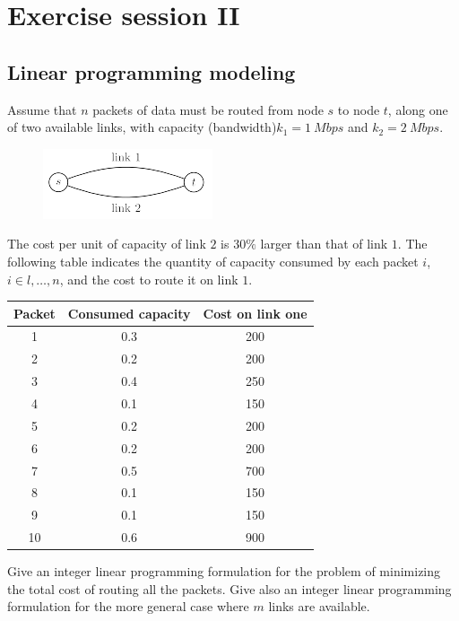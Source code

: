 \documentclass[12pt, a4paper]{report}
\newtheorem[style=M,bodystyle=\normalfont]{theorem}{Theorem}
\newtheorem[style=M,bodystyle=\normalfont]{corollary}{Corollary}
\newtheorem[style=M,bodystyle=\normalfont]{lemma}{Lemma}
\newtheorem[style=M,bodystyle=\normalfont]{definition}{Definition}
\begin{document}
\newpage

\chapter{Exercise session II}
    \section{Linear programming modeling}
        Assume that $n$ packets of data must be routed from node $s$ to node $t$, along one of two available links, with capacity (bandwidth)$ k_1 = 1 \: Mbps$ and $k_2 = 2 \: Mbps$. 
        \begin{figure}[H]
            \centering
            \includegraphics[width=0.3\linewidth]{images/link.png}
        \end{figure}
        The cost per unit of capacity of link $2$ is $30\%$ larger than that of link $1$. The following table indicates the quantity of capacity consumed by each packet 
        $i$, $i \in {l,\dots,n}$, and the cost to route it on link $1$. 
        \begin{table}[H]
            \centering
            \begin{tabular}{c|cc}
            \textbf{Packet} & \textbf{Consumed capacity} & \textbf{Cost on link one} \\ \hline
            1               & 0.3                        & 200                       \\
            2               & 0.2                        & 200                       \\
            3               & 0.4                        & 250                       \\
            4               & 0.1                        & 150                       \\
            5               & 0.2                        & 200                       \\
            6               & 0.2                        & 200                       \\
            7               & 0.5                        & 700                       \\
            8               & 0.1                        & 150                       \\
            9               & 0.1                        & 150                       \\
            10              & 0.6                        & 900                      
            \end{tabular}
        \end{table}
        Give an integer linear programming formulation for the problem of minimizing the total cost of routing all the packets. Give also an integer linear programming formulation for 
        the more general case where $m$ links are available. 
\end{document}
